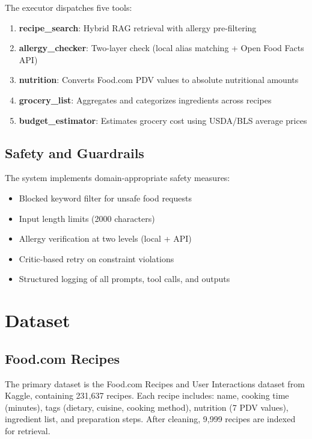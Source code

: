 \documentclass[11pt,twocolumn]{article}
\begin{document}
The executor dispatches five tools:
\begin{enumerate}[nosep]
    \item \textbf{recipe\_search}: Hybrid RAG retrieval with allergy pre-filtering
    \item \textbf{allergy\_checker}: Two-layer check (local alias matching + Open Food Facts API)
    \item \textbf{nutrition}: Converts Food.com PDV values to absolute nutritional amounts
    \item \textbf{grocery\_list}: Aggregates and categorizes ingredients across recipes
    \item \textbf{budget\_estimator}: Estimates grocery cost using USDA/BLS average prices
\end{enumerate}

\subsection{Safety and Guardrails}

The system implements domain-appropriate safety measures:
\begin{itemize}[nosep]
    \item Blocked keyword filter for unsafe food requests
    \item Input length limits (2000 characters)
    \item Allergy verification at two levels (local + API)
    \item Critic-based retry on constraint violations
    \item Structured logging of all prompts, tool calls, and outputs
\end{itemize}

\section{Dataset}

\subsection{Food.com Recipes}

The primary dataset is the Food.com Recipes and User Interactions dataset from Kaggle, containing 231,637 recipes. Each recipe includes: name, cooking time (minutes), tags (dietary, cuisine, cooking method), nutrition (7 PDV values), ingredient list, and preparation steps. After cleaning, 9,999 recipes are indexed for retrieval.
\end{document}
